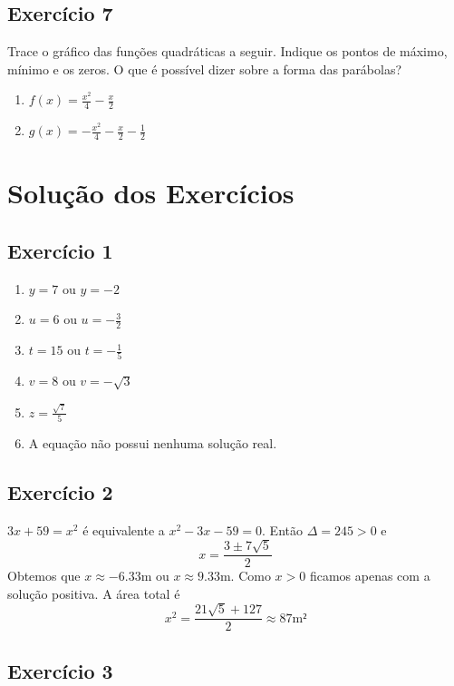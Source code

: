 \subsection*{Exercício 7}

Trace o gráfico das funções quadráticas a seguir.
Indique os pontos de máximo, mínimo e os zeros.
O que é possível dizer sobre a forma das parábolas?

\begin{enumerate}
\item $f(x) = \frac{x^2}{4} - \frac{x}{2}$
\item $g(x) = -\frac{x^2}{4} - \frac{x}{2} - \frac{1}{2}$
\end{enumerate}

\section{Solução dos Exercícios}

\subsection*{Exercício 1}

\begin{enumerate}
\item $y = 7$ ou $y=-2$
\item $u = 6$ ou $u = -\frac{3}{2}$
\item $t = 15$ ou $t = -\frac{1}{5}$
\item $v = 8$ ou $v = -\sqrt{3}$
\item $z = \frac{\sqrt{7}}{5}$
\item A equação não possui nenhuma solução real.
\end{enumerate}

\subsection*{Exercício 2}

$3x + 59 = x^2$ é equivalente a $x^2 - 3x - 59 = 0$.
Então $\Delta = 245 > 0$ e
$$x=\frac{3 \pm 7 \sqrt5}{2}$$
Obtemos que $x \approx -6.33$m ou $x\approx9.33$m.
Como $x > 0$ ficamos apenas com a solução positiva.
A área total é
$$
x^2 = \frac{21 \sqrt5+127}{2} \approx 87 \text{m²}
$$

\subsection*{Exercício 3}

